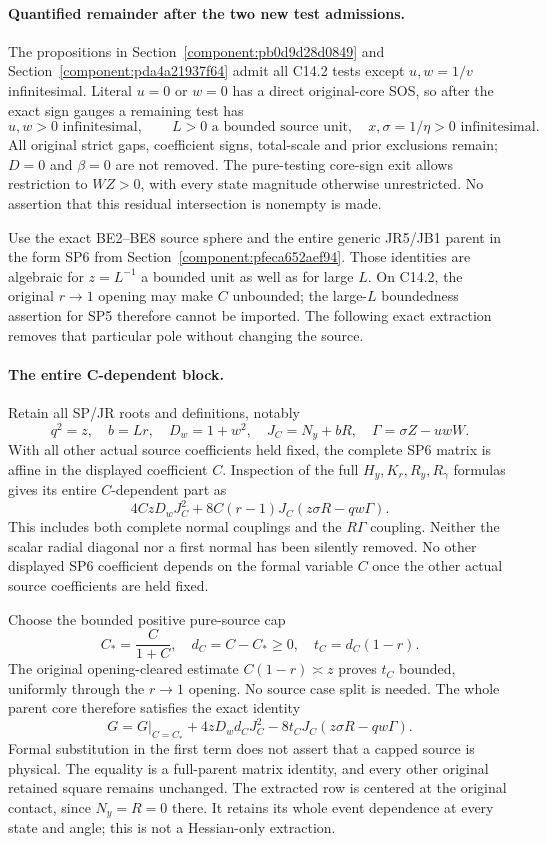 \paragraph{Quantified remainder after the two new test admissions.}
The propositions in Section~\ref{component:pb0d9d28d0849} and
Section~\ref{component:pda4a21937f64} admit all C14.2 tests except $u,w=1/v$
infinitesimal.  Literal $u=0$ or $w=0$ has a direct original-core
SOS, so after the exact sign gauges a remaining test has
\[
 u,w>0\text{ infinitesimal},\qquad
 L>0\text{ a bounded source unit},\quad
 x,\sigma=1/\eta>0\text{ infinitesimal}.             \tag{LC1}
\]
All original strict gaps, coefficient signs, total-scale and prior
exclusions remain; $D=0$ and $\beta=0$ are not removed.
The pure-testing core-sign exit allows restriction to $WZ>0$,
with every state magnitude otherwise unrestricted.  No assertion
that this residual intersection is nonempty is made.

Use the exact BE2--BE8 source sphere and the entire generic JR5/JB1
parent in the form SP6 from
Section~\ref{component:pfeca652aef94}.
Those identities are algebraic for $z=L^{-1}$ a bounded unit as
well as for large $L$.  On C14.2, the original $r\to1$ opening
may make $C$ unbounded; the large-$L$ boundedness assertion for
SP5 therefore cannot be imported.  The following exact extraction
removes that particular pole without changing the source.

\paragraph{The entire C-dependent block.}
Retain all SP/JR roots and definitions, notably
\[
 q^2=z,\quad b=Lr,\quad D_w=1+w^2,\quad
 J_C=N_y+bR,\quad\Gamma=\sigma Z-uwW.
\]
With all other actual source coefficients held fixed, the complete
SP6 matrix is affine in the displayed coefficient $C$.  Inspection
of the full $H_y,K_r,R_y,R_\gamma$ formulas gives its entire
$C$-dependent part as
\[
 4CzD_wJ_C^2
       +8C(r-1)J_C(z\sigma R-qw\Gamma).            \tag{LC2}
\]
This includes both complete normal couplings and the $R\Gamma$
coupling.  Neither the scalar radial diagonal nor a first normal has
been silently removed.  No other displayed SP6 coefficient depends
on the formal variable $C$ once the other actual source coefficients
are held fixed.

Choose the bounded positive pure-source cap
\[
 C_*=\frac C{1+C},\quad d_C=C-C_*\ge0,
 \quad t_C=d_C(1-r).
\]
The original opening-cleared estimate $C(1-r)\asymp z$ proves
$t_C$ bounded, uniformly through the $r\to1$ opening.  No source
case split is needed.  The whole parent core therefore satisfies
the exact identity
\[
 \boxed{\quad
 G=G\big|_{C=C_*}+4zD_wd_CJ_C^2
              -8t_CJ_C(z\sigma R-qw\Gamma).
 \quad}                                                       \tag{LC3}
\]
Formal substitution in the first term does not assert that a capped
source is physical.  The equality is a full-parent matrix identity,
and every other original retained square remains unchanged.
The extracted row is centered at the original contact, since
$N_y=R=0$ there.  It retains its whole event dependence at every
state and angle; this is not a Hessian-only extraction.

